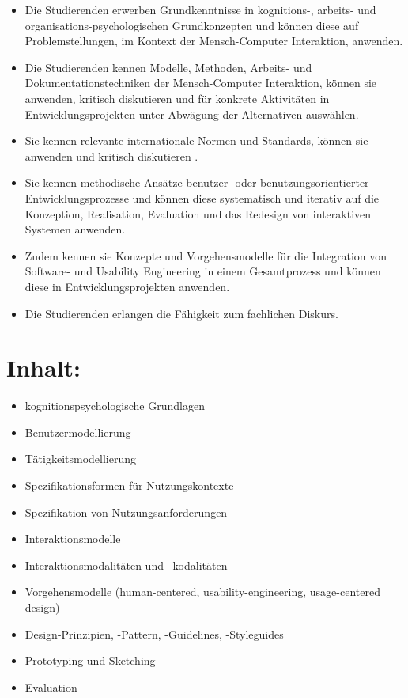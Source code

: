 \begin{itemize}
\tightlist
\item
  Die Studierenden erwerben Grundkenntnisse in kognitions-, arbeits- und
  organisations-psychologischen Grundkonzepten und können diese auf
  Problemstellungen, im Kontext der Mensch-Computer Interaktion,
  anwenden.
\item
  Die Studierenden kennen Modelle, Methoden, Arbeits- und
  Dokumentationstechniken der Mensch-Computer Interaktion, können sie
  anwenden, kritisch diskutieren und für konkrete Aktivitäten in
  Entwicklungsprojekten unter Abwägung der Alternativen auswählen.
\item
  Sie kennen relevante internationale Normen und Standards, können sie
  anwenden und kritisch diskutieren .
\item
  Sie kennen methodische Ansätze benutzer- oder benutzungsorientierter
  Entwicklungsprozesse und können diese systematisch und iterativ auf
  die Konzeption, Realisation, Evaluation und das Redesign von
  interaktiven Systemen anwenden.
\item
  Zudem kennen sie Konzepte und Vorgehensmodelle für die Integration von
  Software- und Usability Engineering in einem Gesamtprozess und können
  diese in Entwicklungsprojekten anwenden.
\item
  Die Studierenden erlangen die Fähigkeit zum fachlichen Diskurs.
\end{itemize}

\section{Inhalt:}\label{inhalt-15}

\begin{itemize}
\tightlist
\item
  kognitionspsychologische Grundlagen
\item
  Benutzermodellierung
\item
  Tätigkeitsmodellierung
\item
  Spezifikationsformen für Nutzungskontexte
\item
  Spezifikation von Nutzungsanforderungen
\item
  Interaktionsmodelle
\item
  Interaktionsmodalitäten und --kodalitäten
\item
  Vorgehensmodelle (human-centered, usability-engineering,
  usage-centered design)
\item
  Design-Prinzipien, -Pattern, -Guidelines, -Styleguides
\item
  Prototyping und Sketching
\item
  Evaluation
\end{itemize}

